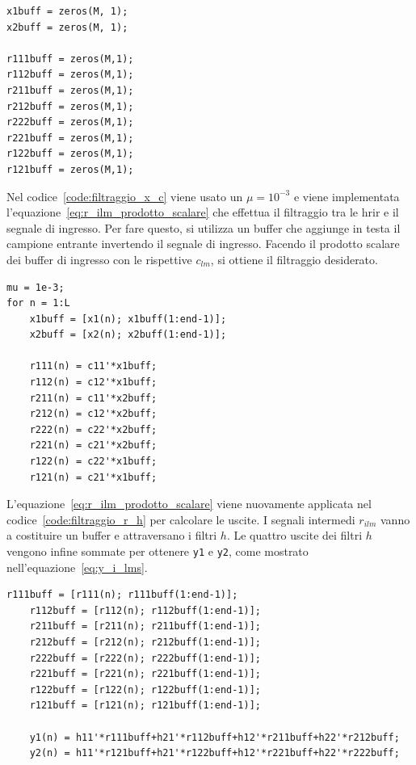 \documentclass[12pt,a4paper,titlepage]{article}
\begin{document}
\begin{lstlisting}[label=code:inizializzazione_vettori_M, caption=Inizializzazione dei vettori di lunghezza M, captionpos=b]
x1buff = zeros(M, 1);
x2buff = zeros(M, 1);

r111buff = zeros(M,1);    
r112buff = zeros(M,1);    
r211buff = zeros(M,1);  
r212buff = zeros(M,1);    
r222buff = zeros(M,1);    
r221buff = zeros(M,1);    
r122buff = zeros(M,1);   
r121buff = zeros(M,1);  
\end{lstlisting}

Nel codice~\ref{code:filtraggio_x_c} viene usato un $\mu = 10^{-3}$ e viene implementata l'equazione~\eqref{eq:r_ilm_prodotto_scalare} che effettua il filtraggio tra le hrir e il segnale di ingresso. Per fare questo, si utilizza un buffer che aggiunge in testa il campione entrante invertendo il segnale di ingresso. Facendo il prodotto scalare dei buffer di ingresso con le rispettive $c_{lm}$, si ottiene il filtraggio desiderato.

\begin{lstlisting}[label=code:filtraggio_x_c, caption=Filtraggio del segnale di ingresso con le hrir, captionpos=b]
mu = 1e-3; 
for n = 1:L
    x1buff = [x1(n); x1buff(1:end-1)];
    x2buff = [x2(n); x2buff(1:end-1)];
   
    r111(n) = c11'*x1buff;
    r112(n) = c12'*x1buff;
    r211(n) = c11'*x2buff;
    r212(n) = c12'*x2buff;
    r222(n) = c22'*x2buff;
    r221(n) = c21'*x2buff;
    r122(n) = c22'*x1buff;
    r121(n) = c21'*x1buff;
\end{lstlisting}

L'equazione~\eqref{eq:r_ilm_prodotto_scalare} viene nuovamente applicata nel codice~\ref{code:filtraggio_r_h} per calcolare le uscite. I segnali intermedi $r_{ilm}$ vanno a costituire un buffer e attraversano i filtri $h$. Le quattro uscite dei filtri $h$ vengono infine sommate per ottenere \texttt{y1} e \texttt{y2}, come mostrato nell'equazione~\eqref{eq:y_i_lms}.

\begin{lstlisting}[label=code:filtraggio_r_h, caption=Calcolo delle uscite, captionpos=b]
    r111buff = [r111(n); r111buff(1:end-1)];
    r112buff = [r112(n); r112buff(1:end-1)];
    r211buff = [r211(n); r211buff(1:end-1)];
    r212buff = [r212(n); r212buff(1:end-1)];
    r222buff = [r222(n); r222buff(1:end-1)];
    r221buff = [r221(n); r221buff(1:end-1)];
    r122buff = [r122(n); r122buff(1:end-1)];
    r121buff = [r121(n); r121buff(1:end-1)];
    
    y1(n) = h11'*r111buff+h21'*r112buff+h12'*r211buff+h22'*r212buff;
    y2(n) = h11'*r121buff+h21'*r122buff+h12'*r221buff+h22'*r222buff;
\end{lstlisting}
\end{document}
